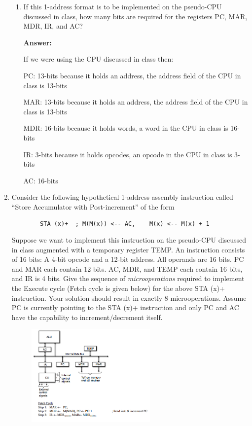 \documentclass[12pt,letterpaper]{article}
\begin{document}
\begin{enumerate}
\begin{enumerate}
        
        \item{If this 1-address format is to be implemented on the pseudo-CPU discussed in class, how many bits are required for the registers PC, MAR, MDR, IR, and AC?}
        
        \textbf{Answer:}
        
        If we were using the CPU discussed in class then:
        
        PC: 13-bits because it holds an address, the address field of the CPU in class is 13-bits
        
        MAR: 13-bits because it holds an address, the address field of the CPU in class is 13-bits
        
        MDR: 16-bits because it holds words, a word in the CPU in class is 16-bits
        
        IR: 3-bits because it holds opcodes, an opcode in the CPU in class is 3-bits
        
        AC: 16-bits 
        
	\end{enumerate}

	
	






	\clearpage
   \item
	Consider the following hypothetical 1-address assembly instruction called “Store Accumulator with Post-increment”
	of the form
	\begin{verbatim}
		STA (x)+  ; M(M(x)) <-- AC,    M(x) <-- M(x) + 1
	\end{verbatim}
	Suppose we want to implement this instruction on the pseudo-CPU discussed in class augmented with a
	temporary register TEMP. 
	An instruction consists of 16 bits: A 4-bit opcode and a 12-bit address. 
	All operands are 16 bits. 
	PC and MAR each contain 12 bits. 
	AC, MDR, and TEMP each contain 16 bits, and IR is 4 bits.
	Give the sequence of \textit{microoperations} required to implement the Execute cycle (Fetch cycle is given below) for
	the above STA (x)+ instruction. 
	Your solution should result in exactly 8 microoperations. 
	Assume PC is currently pointing to the STA (x)+ instruction and only PC and AC have the capability to increment/decrement
	itself. 
	\begin{figure}[h]
		\centering
		\includegraphics[width=0.6\textwidth]{Q2.png}
	\end{figure}


\end{enumerate}
\end{document}
